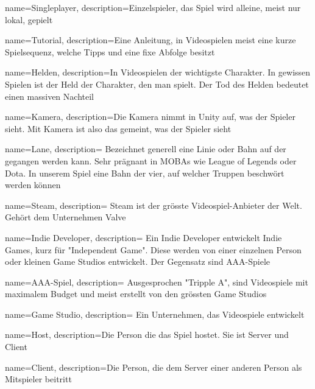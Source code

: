 {
  name={Singleplayer},
  description={Einzelspieler, das Spiel wird alleine, meist nur lokal, gepielt}
}

{
  name={Tutorial},
  description={Eine Anleitung, in Videospielen meist eine kurze Spielsequenz, welche Tipps und eine fixe Abfolge besitzt}
}

{
  name={Helden},
  description={In Videospielen der wichtigste Charakter.
  In gewissen Spielen ist der Held der Charakter, den man spielt.
  Der Tod des Helden bedeutet einen massiven Nachteil}
}

{
  name={Kamera},
  description={Die Kamera nimmt in Unity auf, was der Spieler sieht.
  Mit Kamera ist also das gemeint, was der Spieler sieht}
}

{
  name={Lane},
  description={
    Bezeichnet generell eine Linie oder Bahn auf der gegangen werden kann.
    Sehr prägnant in MOBAs wie League of Legends oder Dota.
    In unserem Spiel eine Bahn der vier, auf welcher Truppen beschwört werden können}
}

{
  name={Steam},
  description={
    Steam ist der grösste Videospiel-Anbieter der Welt.
    Gehört dem Unternehmen Valve}
}

{
  name={Indie Developer},
  description={
    Ein Indie Developer entwickelt Indie Games, kurz für "Independent Game".
    Diese werden von einer einzelnen Person oder kleinen Game Studios entwickelt.
    Der Gegensatz sind \gls{AAA-Spiel}e}
}

{
  name={AAA-Spiel},
  description={
    Ausgesprochen "Tripple A", sind  Videospiele mit maximalem Budget und meist erstellt von den grössten \glspl{Game Studio}}
}

{
  name={Game Studio},
  description={
    Ein Unternehmen, das Videospiele entwickelt}
}

{
  name={Host},
  description={Die Person die das Spiel hostet. Sie ist Server und Client}
}

{
  name={Client},
  description={Die Person, die dem Server einer anderen Person als Mitspieler beitritt}
}


